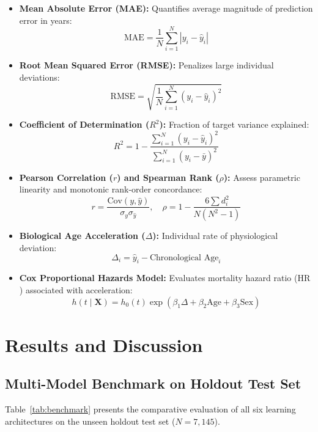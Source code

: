 \documentclass[conference]{IEEEtran}
\begin{document}
\begin{itemize}
    \item \textbf{Mean Absolute Error (MAE):} Quantifies average magnitude of prediction error in years:
    \begin{equation}
    \text{MAE} = \frac{1}{N} \sum_{i=1}^N |y_i - \hat{y}_i|
    \end{equation}
    \item \textbf{Root Mean Squared Error (RMSE):} Penalizes large individual deviations:
    \begin{equation}
    \text{RMSE} = \sqrt{\frac{1}{N} \sum_{i=1}^N (y_i - \hat{y}_i)^2}
    \end{equation}
    \item \textbf{Coefficient of Determination ($R^2$):} Fraction of target variance explained:
    \begin{equation}
    R^2 = 1 - \frac{\sum_{i=1}^N (y_i - \hat{y}_i)^2}{\sum_{i=1}^N (y_i - \bar{y})^2}
    \end{equation}
    \item \textbf{Pearson Correlation ($r$) and Spearman Rank ($\rho$):} Assess parametric linearity and monotonic rank-order concordance:
    \begin{equation}
    r = \frac{\text{Cov}(y, \hat{y})}{\sigma_y \sigma_{\hat{y}}}, \quad \rho = 1 - \frac{6 \sum d_i^2}{N(N^2 - 1)}
    \end{equation}
    \item \textbf{Biological Age Acceleration ($\Delta$):} Individual rate of physiological deviation:
    \begin{equation}
    \Delta_i = \hat{y}_i - \text{Chronological Age}_i
    \end{equation}
    \item \textbf{Cox Proportional Hazards Model:} Evaluates mortality hazard ratio ($\text{HR}$) associated with acceleration:
    \begin{equation}
    h(t \mid \mathbf{X}) = h_0(t) \exp\left( \beta_1 \Delta + \beta_2 \text{Age} + \beta_3 \text{Sex} \right)
    \end{equation}
\end{itemize}

\section{Results and Discussion}

\subsection{Multi-Model Benchmark on Holdout Test Set}
Table~\ref{tab:benchmark} presents the comparative evaluation of all six learning architectures on the unseen holdout test set ($N = 7,145$).
\end{document}
